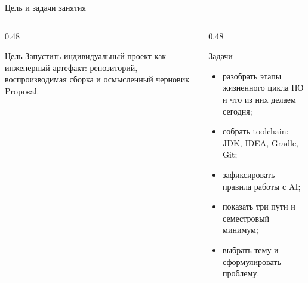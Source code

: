 \begin{frame}{Цель и задачи занятия}
  \sloppy
  \vspace{0.3em}
  \begin{columns}[T]
    \begin{column}{0.48\textwidth}
      \begin{block}{Цель}
        Запустить индивидуальный проект
        как инженерный артефакт:
        репозиторий, воспроизводимая сборка
        и осмысленный черновик Proposal.
      \end{block}
    \end{column}
    \begin{column}{0.48\textwidth}
      \begin{block}{Задачи}
        \begin{itemize}
          \item разобрать этапы жизненного цикла ПО
                и что из них делаем сегодня;
          \item собрать toolchain: JDK, IDEA, Gradle, Git;
          \item зафиксировать правила работы с AI;
          \item показать три пути и семестровый минимум;
          \item выбрать тему и сформулировать проблему.
        \end{itemize}
      \end{block}
    \end{column}
  \end{columns}
\end{frame}
